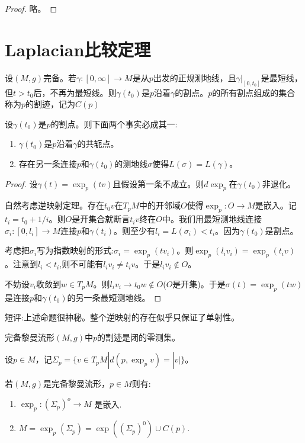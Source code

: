 \begin{proof}
    略。
\end{proof}
\section{Laplacian比较定理}
\begin{definition}[割点]
    设$(M,g)$完备。若$\gamma:[0,\infty] \to M$是从$p$出发的正规测地线，且$\gamma|_{[0,t_0]}$是最短线，但$t>t_0$后，不再为最短线。则$\gamma(t_0)$是$p$沿着$\gamma$的割点。$p$的所有割点组成的集合称为$p$的割迹，记为$C(p)$
\end{definition}
\begin{proposition}
    设$\gamma(t_0)$是$p$的割点。则下面两个事实必成其一:
    \begin{enumerate}
        \item $\gamma(t_0)$是$p$沿着$\gamma$的共轭点。
        \item 存在另一条连接$p$和$\gamma(t_0)$的测地线$\sigma$使得$L(\sigma)=L(\gamma)$。
    \end{enumerate}
\end{proposition}
\begin{proof}
    设$\gamma(t)=\exp_p(tv)$且假设第一条不成立。则$d\exp_p$在$\gamma(t_0)$非退化。

    自然考虑逆映射定理。存在$t_0v$在$T_pM$中的开邻域$O$使得$\exp_p:O \to M$是嵌入。记$t_i=t_0+1/i$。则$O$是开集合就断言$t_iv$终在$O$中。我们用最短测地线连接$\sigma_i:[0,l_i]\to M$连接$p$和$\gamma(t_i)$。则至少有$l_i=L(\sigma_i)< t_i$。因为$\gamma(t_0)$是割点。

    考虑把$\sigma_i$写为指数映射的形式:$\sigma_i=\exp_p(tv_i)$。则$\exp_p(l_iv_i)=\exp_p(t_iv)$。注意到$l_i<t_i$,则不可能有$l_iv_i \neq t_iv$。于是$l_iv_i \notin O$。

    不妨设$v_i$收敛到$w \in T_pM$。则$l_iv_i \to t_0w \notin O$($O$是开集)。于是$\sigma(t)=\exp_p(tw)$是连接$p$和$\gamma(t_0)$的另一条最短测地线。
\end{proof}
短评:上述命题很神秘。整个逆映射的存在似乎只保证了单射性。
\begin{proposition}
    完备黎曼流形$(M,g)$中$p$的割迹是闭的零测集。
\end{proposition}
设$p \in M$，记$\Sigma_p=\{v\in T_p M|d(p,\exp_p v)=|v|\}$。
\begin{proposition}
    若$(M,g)$是完备黎曼流形，$p \in M$则有:
    \begin{enumerate}
        \item $\exp_p:(\Sigma_p)^o \to M$ 是嵌入.
        \item $M= \exp_p(\Sigma_p)=\exp((\Sigma_p)^0)\cup C(p)$.
    \end{enumerate}
\end{proposition}
